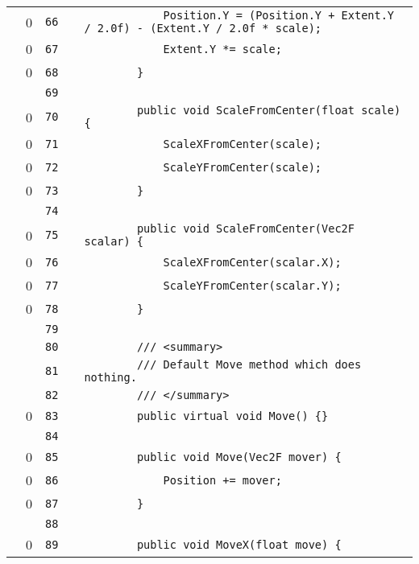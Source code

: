 \documentclass[a4paper,landscape,10pt]{article}
\begin{document}
\begin{longtable}[l]{lrrll}
\cellcolor{red} & 0 & \verb~66~ & & \verb~            Position.Y = (Position.Y + Extent.Y / 2.0f) - (Extent.Y / 2.0f * scale);~\\
\cellcolor{red} & 0 & \verb~67~ & & \verb~            Extent.Y *= scale;~\\
\cellcolor{red} & 0 & \verb~68~ & & \verb~        }~\\
\cellcolor{gray} &  & \verb~69~ & & \verb~~\\
\cellcolor{red} & 0 & \verb~70~ & & \verb~        public void ScaleFromCenter(float scale) {~\\
\cellcolor{red} & 0 & \verb~71~ & & \verb~            ScaleXFromCenter(scale);~\\
\cellcolor{red} & 0 & \verb~72~ & & \verb~            ScaleYFromCenter(scale);~\\
\cellcolor{red} & 0 & \verb~73~ & & \verb~        }~\\
\cellcolor{gray} &  & \verb~74~ & & \verb~~\\
\cellcolor{red} & 0 & \verb~75~ & & \verb~        public void ScaleFromCenter(Vec2F scalar) {~\\
\cellcolor{red} & 0 & \verb~76~ & & \verb~            ScaleXFromCenter(scalar.X);~\\
\cellcolor{red} & 0 & \verb~77~ & & \verb~            ScaleYFromCenter(scalar.Y);~\\
\cellcolor{red} & 0 & \verb~78~ & & \verb~        }~\\
\cellcolor{gray} &  & \verb~79~ & & \verb~~\\
\cellcolor{gray} &  & \verb~80~ & & \verb~        /// <summary>~\\
\cellcolor{gray} &  & \verb~81~ & & \verb~        /// Default Move method which does nothing.~\\
\cellcolor{gray} &  & \verb~82~ & & \verb~        /// </summary>~\\
\cellcolor{red} & 0 & \verb~83~ & & \verb~        public virtual void Move() {}~\\
\cellcolor{gray} &  & \verb~84~ & & \verb~~\\
\cellcolor{red} & 0 & \verb~85~ & & \verb~        public void Move(Vec2F mover) {~\\
\cellcolor{red} & 0 & \verb~86~ & & \verb~            Position += mover;~\\
\cellcolor{red} & 0 & \verb~87~ & & \verb~        }~\\
\cellcolor{gray} &  & \verb~88~ & & \verb~~\\
\cellcolor{red} & 0 & \verb~89~ & & \verb~        public void MoveX(float move) {~\\

\end{longtable}
\end{document}

